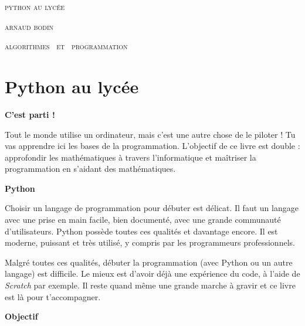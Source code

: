 
\pagestyle{empty}\thispagestyle{empty}
\vspace*{\fill}
\vspace*{5ex}
\begin{center}
\fontsize{52}{52}\selectfont
\textsc{python au lycée}

\vspace*{1ex}

\fontsize{32}{32}\selectfont
\textsc{arnaud bodin}
\end{center}
\vfill
\begin{center}
\huge
\textsc{algorithmes \  et \  programmation}
\end{center}
\begin{center}
\end{center}
\clearemptydoublepage

\thispagestyle{empty}

\vspace*{\fill}
\section*{Python au lycée}

{\large\textbf{C'est parti !}}

Tout le monde utilise un ordinateur, mais c'est une autre chose de le piloter ! Tu vas apprendre ici les bases de la programmation.  L'objectif de ce livre est double :  approfondir les mathématiques à travers l'informatique et maîtriser la programmation en s'aidant des mathématiques. 

\bigskip

{\large\textbf{Python}}

Choisir un langage de programmation pour débuter est délicat. Il faut un langage avec une prise en main facile, bien documenté, avec une grande communauté d'utilisateurs. Python possède toutes ces qualités et davantage encore. Il est moderne, puissant et très utilisé, y compris par les programmeurs professionnels. 

Malgré toutes ces qualités, débuter la programmation (avec Python ou un autre langage) est difficile. Le mieux est d'avoir déjà une expérience du code, à l'aide de \emph{Scratch} par exemple. Il reste quand même une grande marche à gravir et ce livre est là pour t'accompagner.

\bigskip

{\large\textbf{Objectif}}

